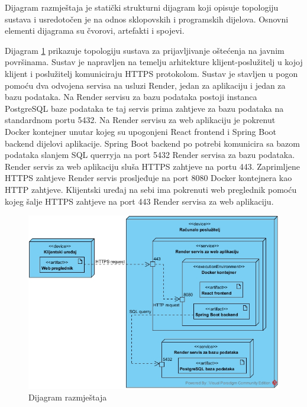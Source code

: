 			Dijagram razmještaja je statički strukturni dijagram koji opisuje topologiju sustava i usredotočen je na odnos sklopovskih i programskih dijelova. Osnovni elementi dijagrama su čvorovi, artefakti i spojevi.
			
			Dijagram \ref{fig:dijagramRazmjestaja} prikazuje topologiju sustava za prijavljivanje oštećenja na javnim površinama. Sustav je napravljen na temelju arhitekture klijent-poslužitelj u kojoj klijent i poslužitelj komuniciraju HTTPS protokolom. Sustav je stavljen u pogon pomoću dva odvojena servisa na usluzi Render, jedan za aplikaciju i jedan za bazu podataka. Na Render servisu za bazu podataka postoji instanca PostgreSQL baze podataka te taj servis prima zahtjeve za bazu podataka na standardnom portu 5432. Na Render servisu za web aplikaciju je pokrenut Docker kontejner unutar kojeg su upogonjeni React frontend i Spring Boot backend dijelovi aplikacije. Spring Boot backend po potrebi komunicira sa bazom podataka slanjem SQL querryja na port 5432 Render servisa za bazu podataka. Render servis za web aplikaciju sluša HTTPS zahtjeve na portu 443. Zaprimljene HTTPS zahtjeve Render servis prosljeđuje na port 8080 Docker kontejnera kao HTTP zahtjeve. Klijentski uređaj na sebi ima pokrenuti web preglednik pomoću kojeg šalje HTTPS zahtjeve na port 443 Render servisa za web aplikaciju.
			
			\begin{figure}[H]
				\includegraphics[width=\textwidth]{slike/dijagramRazmjestaja.jpg} %
				\caption{Dijagram razmještaja}
				\label{fig:dijagramRazmjestaja} %
			\end{figure}
			
